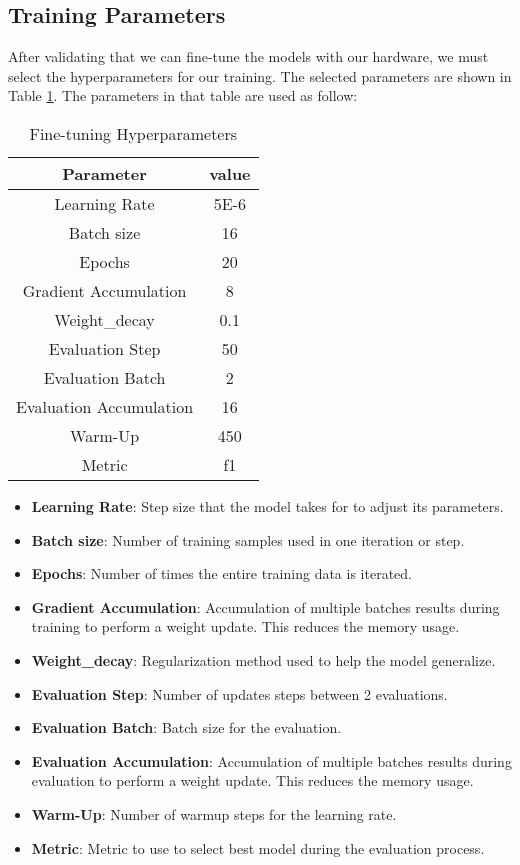 \subsection{Training Parameters}
After validating that we can fine-tune the models with our hardware, we must select the hyperparameters for our training. The selected parameters are shown in Table \ref{table:hyperparameters}.
The parameters in that table are used as follow:

\begin{table}[!ht]
	\centering
	\caption{Fine-tuning Hyperparameters}
	\begin{tabular}{||c | c||} 
		\hline
		\textbf{Parameter} & \textbf{value} \\ [1.5ex] 
		\hline
		Learning Rate & 5E-6  \\ [1ex]
		\hline
		Batch size & 16  \\[1ex]
		\hline
		Epochs & 20 \\[1ex]
		\hline
		Gradient Accumulation & 8 \\[1ex]
		\hline
		Weight\_decay & 0.1 \\[1ex]
		\hline
		Evaluation Step & 50 \\[1ex]
		\hline
		Evaluation Batch & 2 \\[1ex]
		\hline
		Evaluation Accumulation & 16 \\[1ex]
		\hline
		Warm-Up & 450 \\[1ex]
		\hline
		Metric & f1 \\[1ex]
		\hline
	\end{tabular}
	\label{table:hyperparameters}
\end{table}


\begin{itemize}
\item{\textbf{Learning Rate}}: Step size that the model takes for to adjust its parameters.
\item{\textbf{Batch size}}: Number of training samples used in one iteration or step.
\item{\textbf{Epochs}}: Number of times the entire training data is iterated.
\item{\textbf{Gradient Accumulation}}: Accumulation of multiple batches results during training to perform a weight update. This reduces the memory usage. 
\item{\textbf{Weight\_decay}}: Regularization method used to help the model generalize.
\item{\textbf{Evaluation Step}}: Number of updates steps between 2 evaluations.
\item{\textbf{Evaluation Batch}}: Batch size for the evaluation.
\item{\textbf{Evaluation Accumulation}}: Accumulation of multiple batches results during evaluation to perform a weight update. This reduces the memory usage. 
\item{\textbf{Warm-Up}}: Number of warmup steps for the learning rate.
\item{\textbf{Metric}}: Metric to use to select best model during the evaluation process.

\end{itemize}

